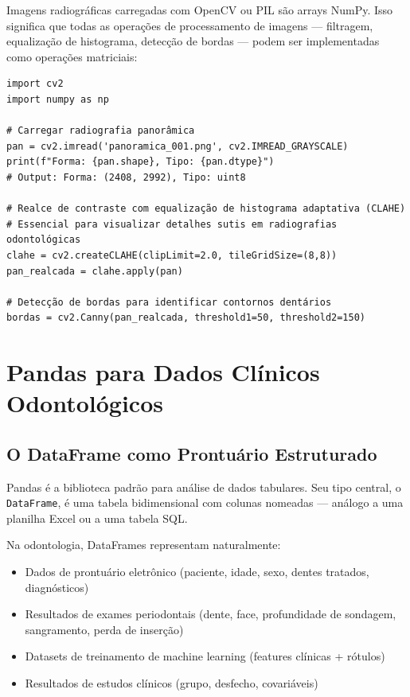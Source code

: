 Imagens radiográficas carregadas com OpenCV ou PIL são arrays NumPy. Isso significa que todas as operações de processamento de imagens — filtragem, equalização de histograma, detecção de bordas — podem ser implementadas como operações matriciais:

\begin{verbatim}
import cv2
import numpy as np

# Carregar radiografia panorâmica
pan = cv2.imread('panoramica_001.png', cv2.IMREAD_GRAYSCALE)
print(f"Forma: {pan.shape}, Tipo: {pan.dtype}")
# Output: Forma: (2408, 2992), Tipo: uint8

# Realce de contraste com equalização de histograma adaptativa (CLAHE)
# Essencial para visualizar detalhes sutis em radiografias odontológicas
clahe = cv2.createCLAHE(clipLimit=2.0, tileGridSize=(8,8))
pan_realcada = clahe.apply(pan)

# Detecção de bordas para identificar contornos dentários
bordas = cv2.Canny(pan_realcada, threshold1=50, threshold2=150)
\end{verbatim}

\section{Pandas para Dados Clínicos Odontológicos}

\subsection{O DataFrame como Prontuário Estruturado}

Pandas  é a biblioteca padrão para análise de dados tabulares. Seu tipo central, o \texttt{DataFrame}, é uma tabela bidimensional com colunas nomeadas — análogo a uma planilha Excel ou a uma tabela SQL.

Na odontologia, DataFrames representam naturalmente:
\begin{itemize}
    \item Dados de prontuário eletrônico (paciente, idade, sexo, dentes tratados, diagnósticos)
    \item Resultados de exames periodontais (dente, face, profundidade de sondagem, sangramento, perda de inserção)
    \item Datasets de treinamento de machine learning (features clínicas + rótulos)
    \item Resultados de estudos clínicos (grupo, desfecho, covariáveis)
\end{itemize}

